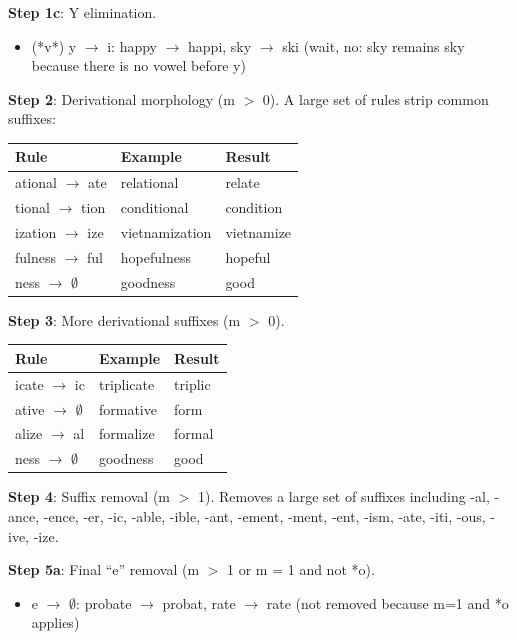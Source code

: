 \documentclass[11pt,a4paper]{article}
\begin{document}
\textbf{Step 1c}: Y elimination.
\begin{itemize}
    \item (*v*) y $\to$ i: happy $\to$ happi, sky $\to$ ski (wait, no: sky remains sky because there is no vowel before y)
\end{itemize}

\textbf{Step 2}: Derivational morphology (m $>$ 0). A large set of rules strip common suffixes:
\begin{center}
\begin{tabular}{|l|l|l|}
\hline
\textbf{Rule} & \textbf{Example} & \textbf{Result} \\ \hline
ational $\to$ ate & relational & relate \\ \hline
tional $\to$ tion & conditional & condition \\ \hline
ization $\to$ ize & vietnamization & vietnamize \\ \hline
fulness $\to$ ful & hopefulness & hopeful \\ \hline
ness $\to$ $\emptyset$ & goodness & good \\ \hline
\end{tabular}
\end{center}

\textbf{Step 3}: More derivational suffixes (m $>$ 0).
\begin{center}
\begin{tabular}{|l|l|l|}
\hline
\textbf{Rule} & \textbf{Example} & \textbf{Result} \\ \hline
icate $\to$ ic & triplicate & triplic \\ \hline
ative $\to$ $\emptyset$ & formative & form \\ \hline
alize $\to$ al & formalize & formal \\ \hline
ness $\to$ $\emptyset$ & goodness & good \\ \hline
\end{tabular}
\end{center}

\textbf{Step 4}: Suffix removal (m $>$ 1). Removes a large set of suffixes including -al, -ance, -ence, -er, -ic, -able, -ible, -ant, -ement, -ment, -ent, -ism, -ate, -iti, -ous, -ive, -ize.

\textbf{Step 5a}: Final ``e'' removal (m $>$ 1 or m = 1 and not *o).
\begin{itemize}
    \item e $\to$ $\emptyset$: probate $\to$ probat, rate $\to$ rate (not removed because m=1 and *o applies)
\end{itemize}
\end{document}
